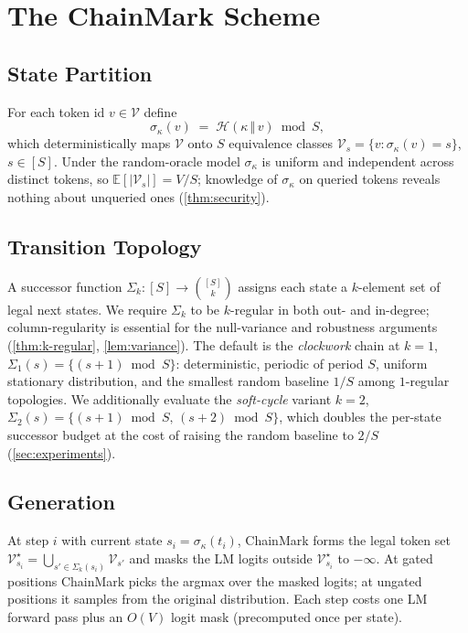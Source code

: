 \section{The ChainMark Scheme}
\label{sec:method}

\subsection{State Partition}

For each token id $v \in \mathcal{V}$ define
\begin{equation}
  \sigma_\kappa(v) \;=\; \mathcal{H}(\kappa \,\Vert\, v) \bmod S,
\end{equation}
which deterministically maps $\mathcal{V}$ onto $S$ equivalence
classes $\mathcal{V}_s = \{v : \sigma_\kappa(v) = s\}$, $s \in [S]$. Under
the random-oracle model $\sigma_\kappa$ is uniform and independent across
distinct tokens, so $\mathbb{E}[|\mathcal{V}_s|] = V/S$; knowledge
of $\sigma_\kappa$ on queried tokens reveals nothing about unqueried ones
(\autoref{thm:security}).

\subsection{Transition Topology}
\label{subsec:topology}

A successor function $\Sigma_k : [S] \to \binom{[S]}{k}$ assigns
each state a $k$-element set of legal next states. We require
$\Sigma_k$ to be $k$-regular in both out- and in-degree;
column-regularity is essential for the null-variance and robustness
arguments (\autoref{thm:k-regular}, \autoref{lem:variance}). The
default is the \emph{clockwork} chain at $k = 1$,
$\Sigma_1(s) = \{(s{+}1) \bmod S\}$: deterministic, periodic of
period $S$, uniform stationary distribution, and the smallest random
baseline $1/S$ among $1$-regular topologies. We additionally
evaluate the \emph{soft-cycle} variant $k = 2$,
$\Sigma_2(s) = \{(s{+}1) \bmod S,\,(s{+}2) \bmod S\}$, which doubles
the per-state successor budget at the cost of raising the random
baseline to $2/S$ (\autoref{sec:experiments}).

\subsection{Generation}

At step $i$ with current state $s_i = \sigma_\kappa(t_i)$, ChainMark forms
the legal token set $\mathcal{V}_{s_i}^\star =
\bigcup_{s' \in \Sigma_k(s_i)} \mathcal{V}_{s'}$ and masks the LM
logits outside $\mathcal{V}_{s_i}^\star$ to $-\infty$. At gated
positions ChainMark picks the argmax over the masked logits; at ungated
positions it samples from the original distribution. Each step costs one LM forward pass
plus an $O(V)$ logit mask (precomputed once per state).

